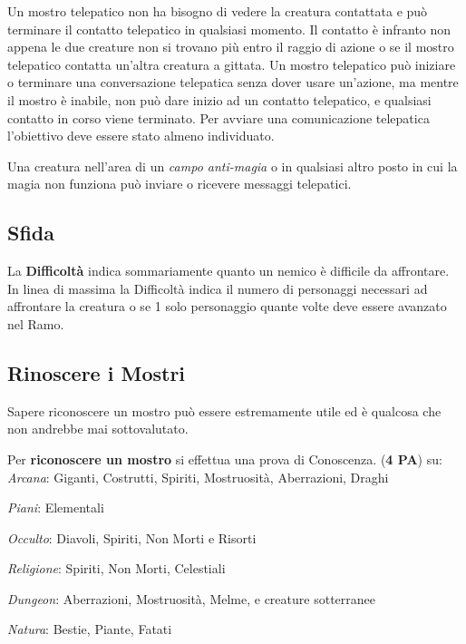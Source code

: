 \documentclass[12pt,a4paper,twoside,openany]{book}
\begin{document}
\begin{multicols}{2}
Un mostro telepatico non ha bisogno di vedere la creatura contattata e può terminare il contatto telepatico in qualsiasi momento. Il contatto è infranto non appena le due creature non si trovano più entro il raggio di azione o se il mostro telepatico contatta un'altra creatura a gittata. Un mostro telepatico può iniziare o terminare una conversazione telepatica senza dover usare un'azione, ma mentre il mostro è inabile, non può dare inizio ad un contatto telepatico, e qualsiasi contatto in corso viene terminato. Per avviare una comunicazione telepatica l'obiettivo deve essere stato almeno individuato.

Una creatura nell'area di un \textit{campo anti-magia} o in qualsiasi altro posto in cui la magia non funziona può inviare o ricevere messaggi telepatici.

\subsection{Sfida}

La \textbf{Difficoltà} indica sommariamente quanto un nemico è difficile da affrontare. In linea di massima la Difficoltà indica il numero di personaggi necessari ad affrontare la creatura o se 1 solo personaggio quante volte deve essere avanzato nel Ramo.

\subsection{Rinoscere i Mostri}\label{riconoscereimostri}\hypertarget{riconoscereimostri}{} 

Sapere riconoscere un mostro può essere estremamente utile ed è qualcosa che non andrebbe mai sottovalutato.

Per \textbf{riconoscere un mostro} si effettua una prova di Conoscenza. (\textbf{4 PA}) su:\\

\textit{Arcana}: Giganti, Costrutti, Spiriti, Mostruosità, Aberrazioni, Draghi

\textit{Piani}: Elementali

\textit{Occulto}: Diavoli, Spiriti, Non Morti e Risorti

\textit{Religione}: Spiriti, Non Morti, Celestiali

\textit{Dungeon}: Aberrazioni, Mostruosità, Melme, e creature sotterranee

\textit{Natura}: Bestie, Piante, Fatati\\


\end{multicols}
\end{document}
